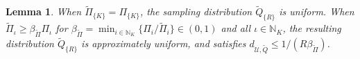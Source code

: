 \documentclass[journal,letterpaper,onecolumn,twoside,nofonttune]{IEEEtran}
\newcommand{\N}{\mathbb{N}}
\newcommand{\Uu}{\mathcal{U}}
\newcommand{\Ub}{\bold{U}}
\newcommand{\Ubt}{\tilde{\Ub}}
\newcommand{\Vb}{\bold{V}}
\newcommand{\Ab}{\bold{A}}
\newcommand{\Qt}{\tilde{Q}}
\newcommand{\Sigb}{\bold{\Sigma}}
\newcommand{\Abt}{\tilde{\Ab}}
\newcommand{\Pit}{\tilde{\Pi}}
\newcommand{\PsiB}{\bold{\Psi}}
\newtheorem{Lemma}{Lemma}
\begin{document}
\begin{Lemma}
\label{Lemma_flat}
When $\Pit_{\{K\}}=\Pi_{\{K\}}$, the sampling distribution $\Qt_{\{R\}}$ is uniform. When $\Pit_\iota\geqslant\beta_{\Pit}\Pi_\iota$ for $\beta_{\Pit}=\min_{i\in\N_K}\{\Pi_i/\Pit_i\}\in(0,1)$ and all $\iota\in\N_K$, the resulting distribution $\Qt_{\{R\}}$ is approximately uniform, and satisfies  $d_{\Uu,\Qt}\leqslant1\big/(R\beta_{\Pit})$.
\end{Lemma}
\end{document}
